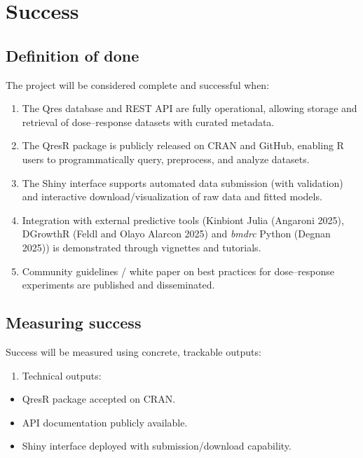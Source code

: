 \documentclass[
  letterpaper,
  DIV=11,
  numbers=noendperiod]{scrartcl}
\providecommand{\tightlist}{%
  \setlength{\itemsep}{0pt}\setlength{\parskip}{0pt}}
\begin{document}
\section{Success}\label{success}

\subsection{Definition of done}\label{definition-of-done}

The project will be considered complete and successful when:

\begin{enumerate}
\def\labelenumi{\arabic{enumi}.}
\item
  The Qres database and REST API are fully operational, allowing storage
  and retrieval of dose--response datasets with curated metadata.
\item
  The QresR package is publicly released on CRAN and GitHub, enabling R
  users to programmatically query, preprocess, and analyze datasets.
\item
  The Shiny interface supports automated data submission (with
  validation) and interactive download/visualization of raw data and
  fitted models.
\item
  Integration with external predictive tools (Kinbiont Julia (Angaroni
  2025), DGrowthR (Feldl and Olayo Alarcon 2025) and \emph{bmdrc} Python
  (Degnan 2025)) is demonstrated through vignettes and tutorials.
\item
  Community guidelines / white paper on best practices for
  dose--response experiments are published and disseminated.
\end{enumerate}

\subsection{Measuring success}\label{measuring-success}

Success will be measured using concrete, trackable outputs:

\begin{enumerate}
\def\labelenumi{\arabic{enumi}.}
\tightlist
\item
  Technical outputs:
\end{enumerate}

\begin{itemize}
\tightlist
\item
  QresR package accepted on CRAN.
\item
  API documentation publicly available.
\item
  Shiny interface deployed with submission/download capability.
\end{itemize}
\end{document}
